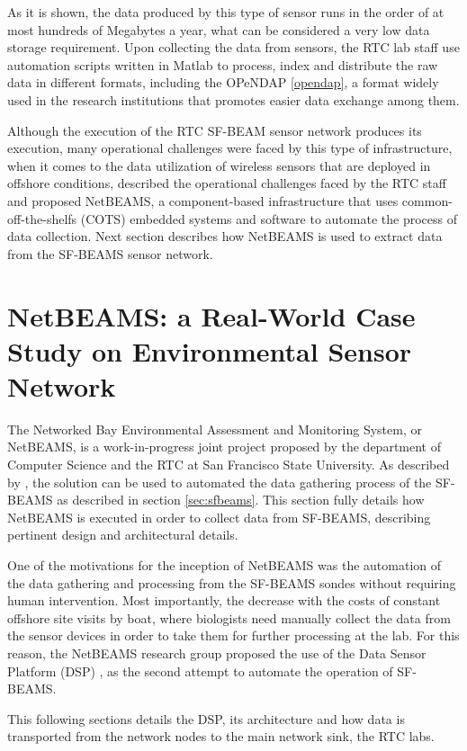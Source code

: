 As it is shown, the data produced by this type of sensor runs in the order of
at most hundreds of Megabytes a year, what can be considered a very low data
storage requirement. Upon collecting the data from sensors, the RTC lab staff
use automation scripts written in Matlab to process, index and distribute the
raw data in different formats, including the OPeNDAP \ref{opendap}, a format
widely used in the research institutions that promotes easier data exchange
among them.

Although the execution of the RTC SF-BEAM sensor network produces its
execution, many operational challenges were faced by this type of
infrastructure, when it comes to the data utilization of wireless sensors that
are deployed in offshore conditions, \cite{netbeams2009} described the
operational challenges faced by the RTC staff and proposed NetBEAMS, a
component-based infrastructure that uses common-off-the-shelfs (COTS) embedded
systems and software to automate the process of data collection. Next section
describes how NetBEAMS is used to extract data from the SF-BEAMS sensor network.

\section{NetBEAMS: a Real-World Case Study on Environmental Sensor Network}

The Networked Bay Environmental Assessment and Monitoring System, or NetBEAMS, 
is a work-in-progress joint project proposed by the department of Computer
Science and the RTC at San Francisco State University. As described by
\cite{netbeams2009}, the solution can be used to automated the data gathering
process of the SF-BEAMS as described in section \ref{sec:sfbeams}. This
section fully details how NetBEAMS is executed in order to collect data from
SF-BEAMS, describing pertinent design and architectural details.

One of the motivations for the inception of NetBEAMS was the automation
of the data gathering and processing from the SF-BEAMS sondes without requiring
human intervention. Most importantly, the decrease with the costs of constant 
offshore site visits by boat, where biologists need manually collect the data
from the sensor devices in order to take them for further processing at the
lab. For this reason, the NetBEAMS research group proposed the use of the Data
Sensor Platform (DSP) \cite{netbeams2009}, as the second attempt to automate
the operation of SF-BEAMS.

This following sections details the DSP, its architecture and how data is
transported from the network nodes to the main network sink, the RTC labs.

